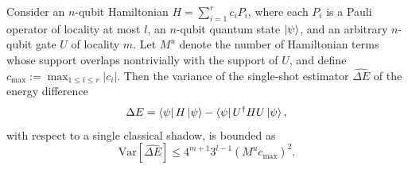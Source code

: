 \begin{lemma}
    \label{lemma:variance_energy}
    Consider an $n$-qubit Hamiltonian $H=\sum^r_{i=1}c_iP_i$, where each $P_i$ is a Pauli operator of locality at most $l$, an $n$-qubit quantum state $\ket{\psi}$, and an arbitrary $n$-qubit gate $U$ of locality $m$. Let $M^u$ denote the number of Hamiltonian terms whose support overlaps nontrivially with the support of $U$, and define $c_\mathrm{max}:=\max_{1\leq i\leq r}|c_i|$. Then the variance of the single-shot estimator $\hat{\Delta E}$ of the energy difference
    \begin{equation}
        \Delta E= \bra{\psi}H\ket{\psi}-\bra{\psi}U^\dagger H U \ket{\psi},
    \end{equation}
    with respect to a single classical shadow, is bounded as
    \begin{equation}
        \mathrm{Var}\left[\hat{\Delta E}\right]\leq 4^{m+1}3^{l-1}\left(M^uc_\mathrm{max}\right)^2.
    \end{equation}
\end{lemma}

